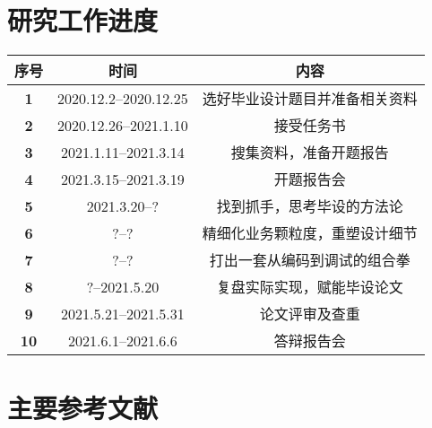 \documentclass{HDU-Bachelor-Thesis-Proposal}
\begin{document}
\section{研究工作进度}

\begin{table}[h]%
	\centering
	\begin{tabular}{| c | c | c |}%
    \hline
	\bfseries 序号 & \bfseries 时间 & \bfseries 内容 \\ \hline
	\bfseries 1 & 2020.12.2--2020.12.25 & 选好毕业设计题目并准备相关资料 \\ \hline
	\bfseries 2 & 2020.12.26--2021.1.10 & 接受任务书 \\ \hline
    \bfseries 3 & 2021.1.11--2021.3.14 & 搜集资料，准备开题报告 \\ \hline
	\bfseries 4 & 2021.3.15--2021.3.19 & 开题报告会 \\ \hline
    \bfseries 5 & 2021.3.20--? & 找到抓手，思考毕设的方法论 \\ \hline
	\bfseries 6 & ?--? & 精细化业务颗粒度，重塑设计细节 \\ \hline
    \bfseries 7 & ?--? & 打出一套从编码到调试的组合拳 \\ \hline
	\bfseries 8 & ?--2021.5.20 & 复盘实际实现，赋能毕设论文 \\ \hline
    \bfseries 9 & 2021.5.21--2021.5.31 & 论文评审及查重 \\ \hline
	\bfseries 10 & 2021.6.1--2021.6.6 & 答辩报告会 \\ \hline
    \end{tabular}
\end{table}

\clearpage
\section{主要参考文献}
\printbibliography[heading=none]

\makeassessment
\end{document}
